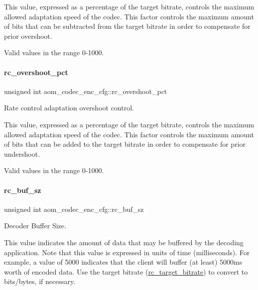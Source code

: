 This value, expressed as a percentage of the target bitrate, controls the maximum allowed adaptation speed of the codec. This factor controls the maximum amount of bits that can be subtracted from the target bitrate in order to compensate for prior overshoot.

Valid values in the range 0-\/1000. \mbox{\label{structaom__codec__enc__cfg_ad57c8287bcacf2ca7230a3e11906b65c}} 
\paragraph{\texorpdfstring{rc\+\_\+overshoot\+\_\+pct}{rc\_overshoot\_pct}}
{\footnotesize\ttfamily unsigned int aom\+\_\+codec\+\_\+enc\+\_\+cfg\+::rc\+\_\+overshoot\+\_\+pct}



Rate control adaptation overshoot control. 

This value, expressed as a percentage of the target bitrate, controls the maximum allowed adaptation speed of the codec. This factor controls the maximum amount of bits that can be added to the target bitrate in order to compensate for prior undershoot.

Valid values in the range 0-\/1000. \mbox{\label{structaom__codec__enc__cfg_a2eb74c50bbc22536248925cd92b746c2}} 
\paragraph{\texorpdfstring{rc\+\_\+buf\+\_\+sz}{rc\_buf\_sz}}
{\footnotesize\ttfamily unsigned int aom\+\_\+codec\+\_\+enc\+\_\+cfg\+::rc\+\_\+buf\+\_\+sz}



Decoder Buffer Size. 

This value indicates the amount of data that may be buffered by the decoding application. Note that this value is expressed in units of time (milliseconds). For example, a value of 5000 indicates that the client will buffer (at least) 5000ms worth of encoded data. Use the target bitrate (\hyperlink{structaom__codec__enc__cfg_ab21539da477dba7506d90353c27d218b}{rc\+\_\+target\+\_\+bitrate}) to convert to bits/bytes, if necessary. \mbox{\label{structaom__codec__enc__cfg_a6c25595e7dfcdf3229c3f66c91224fcc}} 
